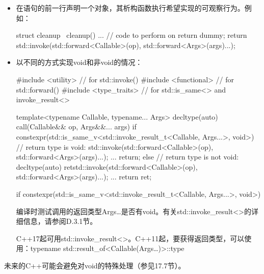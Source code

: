 \begin{itemize}
\item
在语句的前一行声明一个对象，其析构函数执行希望实现的可观察行为。例如：

\begin{cpp}
struct cleanup {
	~cleanup() {
		... // code to perform on return
	}
} dummy;
return std::invoke(std::forward<Callable>(op),
					std::forward<Args>(args)...);
\end{cpp}

\item
以不同的方式实现void和非void的情况：

\begin{cpp}
#include <utility> // for std::invoke()
#include <functional> // for std::forward()
#include <type_traits> // for std::is_same<> and invoke_result<>

template<typename Callable, typename... Args>
decltype(auto) call(Callable&& op, Args&&... args)
{
	if constexpr(std::is_same_v<std::invoke_result_t<Callable, Args...>,
	void>) {
		// return type is void:
		std::invoke(std::forward<Callable>(op),
					std::forward<Args>(args)...);
		...
		return;
	}
	else {
		// return type is not void:
		decltype(auto) ret{std::invoke(std::forward<Callable>(op),
							std::forward<Args>(args)...)};
		...
		return ret;
	}
}
\end{cpp}

\begin{cpp}
if constexpr(std::is_same_v<std::invoke_result_t<Callable, Args...>, void>)
\end{cpp}

编译时测试调用的返回类型Args…是否有void。有关std::invoke\_result<>的详细信息，请参阅D.3.1节。

\begin{notice}
C++17起可用std::invoke\_result<>。C++11起，要获得返回类型，可以使用：typename std::result\_of<Callable(Args…)>::type
\end{notice}

\end{itemize}

未来的C++可能会避免对void的特殊处理（参见17.7节）。












